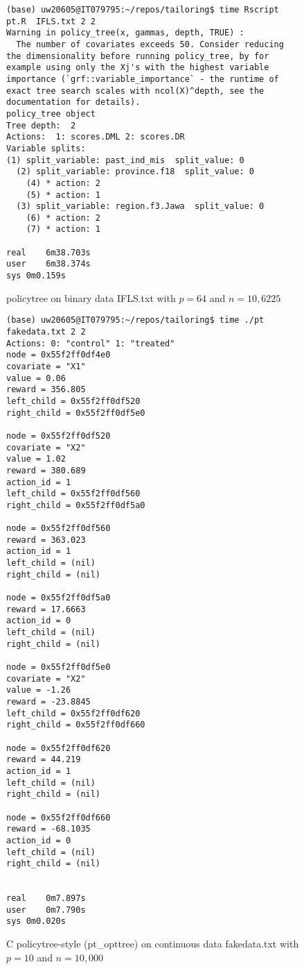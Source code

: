 \documentclass{article}
\begin{document}
\begin{figure}
  \centering
\begin{verbatim}
(base) uw20605@IT079795:~/repos/tailoring$ time Rscript pt.R  IFLS.txt 2 2 
Warning in policy_tree(x, gammas, depth, TRUE) :
  The number of covariates exceeds 50. Consider reducing the dimensionality before running policy_tree, by for example using only the Xj's with the highest variable importance (`grf::variable_importance` - the runtime of exact tree search scales with ncol(X)^depth, see the documentation for details).
policy_tree object 
Tree depth:  2 
Actions:  1: scores.DML 2: scores.DR 
Variable splits: 
(1) split_variable: past_ind_mis  split_value: 0 
  (2) split_variable: province.f18  split_value: 0 
    (4) * action: 2 
    (5) * action: 1 
  (3) split_variable: region.f3.Jawa  split_value: 0 
    (6) * action: 2 
    (7) * action: 1 

real	6m38.703s
user	6m38.374s
sys	0m0.159s
\end{verbatim}
  \caption{policytree on binary data IFLS.txt
    with $p=64$ and $n=10,6225$}
\end{figure}

\begin{figure}
  \centering
\begin{verbatim}
(base) uw20605@IT079795:~/repos/tailoring$ time ./pt fakedata.txt 2 2 
Actions: 0: "control" 1: "treated" 
node = 0x55f2ff0df4e0
covariate = "X1"
value = 0.06
reward = 356.805
left_child = 0x55f2ff0df520
right_child = 0x55f2ff0df5e0

node = 0x55f2ff0df520
covariate = "X2"
value = 1.02
reward = 380.689
action_id = 1
left_child = 0x55f2ff0df560
right_child = 0x55f2ff0df5a0

node = 0x55f2ff0df560
reward = 363.023
action_id = 1
left_child = (nil)
right_child = (nil)

node = 0x55f2ff0df5a0
reward = 17.6663
action_id = 0
left_child = (nil)
right_child = (nil)

node = 0x55f2ff0df5e0
covariate = "X2"
value = -1.26
reward = -23.8845
left_child = 0x55f2ff0df620
right_child = 0x55f2ff0df660

node = 0x55f2ff0df620
reward = 44.219
action_id = 1
left_child = (nil)
right_child = (nil)

node = 0x55f2ff0df660
reward = -68.1035
action_id = 0
left_child = (nil)
right_child = (nil)


real	0m7.897s
user	0m7.790s
sys	0m0.020s
\end{verbatim}
  \caption{C policytree-style (pt\_opttree) on continuous data fakedata.txt
        with $p=10$ and $n=10,000$}
\end{figure}
\end{document}
